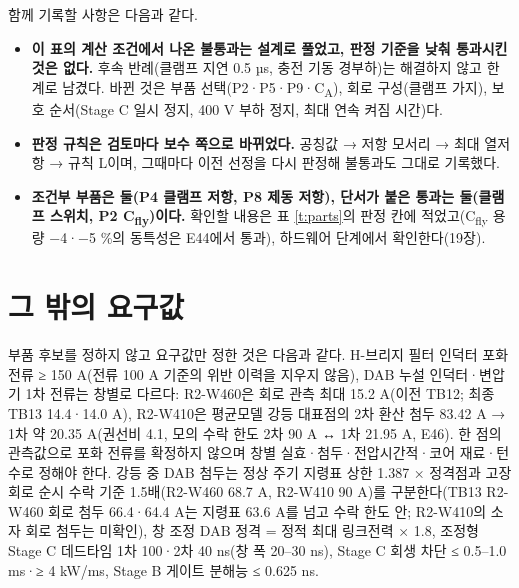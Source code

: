 함께 기록할 사항은 다음과 같다.

\begin{itemize}
\item \textbf{이 표의 계산 조건에서 나온 불통과는 설계로 풀었고, 판정 기준을 낮춰 통과시킨 것은 없다.} 후속 반례(클램프 지연 0.5 µs, 충전 기동 경부하)는 해결하지 않고 한계로 남겼다. 바뀐 것은 부품 선택(P2·P5·P9·C\textsubscript{A}), 회로 구성(클램프 가지), 보호 순서(Stage C 일시 정지, 400 V 부하 정지, 최대 연속 켜짐 시간)다.
\item \textbf{판정 규칙은 검토마다 보수 쪽으로 바뀌었다.} 공칭값 → 저항 모서리 → 최대 열저항 → 규칙 L이며, 그때마다 이전 선정을 다시 판정해 불통과도 그대로 기록했다.
\item \textbf{조건부 부품은 둘(P4 클램프 저항, P8 제동 저항), 단서가 붙은 통과는 둘(클램프 스위치, P2 C\textsubscript{fly})이다.} 확인할 내용은 표 \ref{t:parts}의 판정 칸에 적었고(C\textsubscript{fly} 용량 −4·−5 \%의 동특성은 E44에서 통과), 하드웨어 단계에서 확인한다(19장).
\end{itemize}

\section{그 밖의 요구값}

부품 후보를 정하지 않고 요구값만 정한 것은 다음과 같다. H-브리지 필터 인덕터 포화 전류 ≥ 150 A(전류 100 A 기준의 위반 이력을 지우지 않음), DAB 누설 인덕터·변압기 1차 전류는 창별로 다르다: R2-W460은 회로 관측 최대 15.2 A(이전 TB12; 최종 TB13 14.4·14.0 A), R2-W410은 평균모델 강등 대표점의 2차 환산 첨두 83.42 A → 1차 약 20.35 A(권선비 4.1, 모의 수락 한도 2차 90 A ↔ 1차 21.95 A, E46). 한 점의 관측값으로 포화 전류를 확정하지 않으며 창별 실효·첨두·전압시간적·코어 재료·턴수로 정해야 한다. 강등 중 DAB 첨두는 정상 주기 지령표 상한 1.387 × 정격점과 고장 회로 순시 수락 기준 1.5배(R2-W460 68.7 A, R2-W410 90 A)를 구분한다(TB13 R2-W460 회로 첨두 66.4·64.4 A는 지령표 63.6 A를 넘고 수락 한도 안; R2-W410의 소자 회로 첨두는 미확인), 창 조정 DAB 정격 = 정적 최대 링크전력 × 1.8, 조정형 Stage C 데드타임 1차 100·2차 40 ns(창 폭 20–30 ns), Stage C 회생 차단 ≤ 0.5–1.0 ms·≥ 4 kW/ms, Stage B 게이트 분해능 ≤ 0.625 ns.
